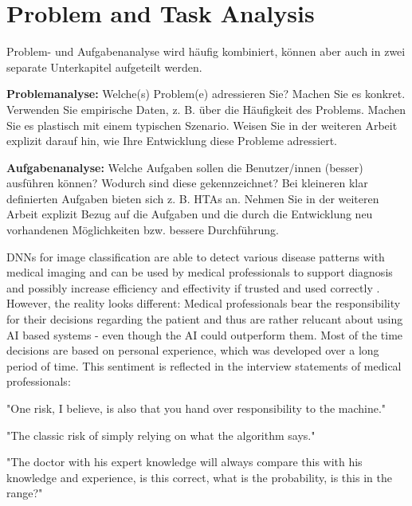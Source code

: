 \documentclass[11pt,a4paper,english]{scrreprt}
\newenvironment{comment}
  {\par\medskip
   \begingroup\color{olive}%
   }
 {\endgroup
  \medskip}
\begin{document}
\section{Problem and Task Analysis}
\begin{comment}
    Problem- und Aufgabenanalyse wird häufig kombiniert, können aber auch in zwei separate Unterkapitel aufgeteilt werden.

    \textbf{Problemanalyse:} Welche(s) Problem(e) adressieren Sie? Machen Sie es konkret. Verwenden Sie empirische Daten, z. B. über die Häufigkeit des Problems. Machen Sie es plastisch mit einem typischen Szenario. Weisen Sie in der weiteren Arbeit explizit darauf hin, wie Ihre Entwicklung diese Probleme adressiert.
\end{comment}
\begin{comment}
    \textbf{Aufgabenanalyse:} Welche Aufgaben sollen die Benutzer/innen (besser) ausführen können? Wodurch sind diese gekennzeichnet? Bei kleineren klar definierten Aufgaben bieten sich z. B. HTAs an. Nehmen Sie in der weiteren Arbeit explizit Bezug auf die Aufgaben und die durch die Entwicklung neu vorhandenen Möglichkeiten bzw. bessere Durchführung.
\end{comment}

DNNs for image classification are able to detect various disease patterns with medical imaging and can be used by medical professionals to support diagnosis and possibly increase efficiency and effectivity if trusted and used correctly \parencite{adadi_blackbox_2018,knapic_explainable_2021}. However, the reality looks different: Medical professionals bear the responsibility for their decisions regarding the patient and thus are rather relucant about using AI based systems - even though the AI could outperform them. Most of the time decisions are based on personal experience, which was developed over a long period of time. This sentiment is reflected in the interview statements of medical professionals:
\begin{displayquote}
    "One risk, I believe, is also that you hand over responsibility to the machine."
\end{displayquote}
\begin{displayquote}
    "The classic risk of simply relying on what the algorithm says."
\end{displayquote}
\begin{displayquote}
    "The doctor with his expert knowledge will always compare this with his knowledge and experience, is this correct, what is the probability, is this in the range?"
\end{displayquote}
\end{document}
